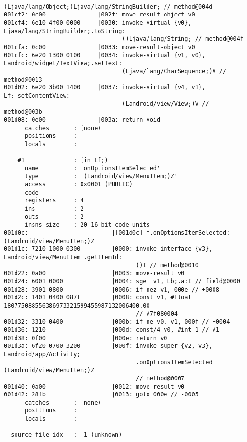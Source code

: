\begin{lstlisting}
                                  (Ljava/lang/Object;)Ljava/lang/StringBuilder; // method@004d
001cf2: 0c00               |002f: move-result-object v0
001cf4: 6e10 4f00 0000     |0030: invoke-virtual {v0}, Ljava/lang/StringBuilder;.toString:
                                  ()Ljava/lang/String; // method@004f
001cfa: 0c00               |0033: move-result-object v0
001cfc: 6e20 1300 0100     |0034: invoke-virtual {v1, v0}, Landroid/widget/TextView;.setText:
                                  (Ljava/lang/CharSequence;)V // method@0013
001d02: 6e20 3b00 1400     |0037: invoke-virtual {v4, v1}, Lf;.setContentView:
                                  (Landroid/view/View;)V // method@003b
001d08: 0e00               |003a: return-void
      catches       : (none)
      positions     :
      locals        :

    #1              : (in Lf;)
      name          : 'onOptionsItemSelected'
      type          : '(Landroid/view/MenuItem;)Z'
      access        : 0x0001 (PUBLIC)
      code          -
      registers     : 4
      ins           : 2
      outs          : 2
      insns size    : 20 16-bit code units
001d0c:                        |[001d0c] f.onOptionsItemSelected:(Landroid/view/MenuItem;)Z
001d1c: 7210 1000 0300         |0000: invoke-interface {v3}, Landroid/view/MenuItem;.getItemId:
                                      ()I // method@0010
001d22: 0a00                   |0003: move-result v0
001d24: 6001 0000              |0004: sget v1, Lb;.a:I // field@0000
001d28: 3901 0800              |0006: if-nez v1, 000e // +0008
001d2c: 1401 0400 087f         |0008: const v1, #float 180775088556386973321599455987132006400.00
                                      // #7f080004
001d32: 3310 0400              |000b: if-ne v0, v1, 000f // +0004
001d36: 1210                   |000d: const/4 v0, #int 1 // #1
001d38: 0f00                   |000e: return v0
001d3a: 6f20 0700 3200         |000f: invoke-super {v2, v3}, Landroid/app/Activity;
                                      .onOptionsItemSelected:(Landroid/view/MenuItem;)Z
                                      // method@0007
001d40: 0a00                   |0012: move-result v0
001d42: 28fb                   |0013: goto 000e // -0005
      catches       : (none)
      positions     :
      locals        :

  source_file_idx   : -1 (unknown)
\end{lstlisting}
